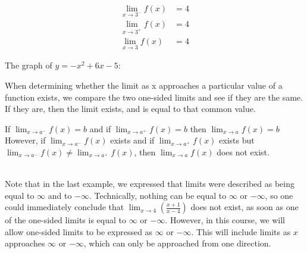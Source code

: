\documentclass{article}
\begin{document}
\begin{minipage}{0.6\textwidth}
    \begin{align*}
        \lim_{x \to 3^-} f(x) &= 4 \\
        \lim_{x \to 3^+} f(x) &= 4 \\
        \lim_{x \to 3} f(x) &= 4
    \end{align*}
\end{minipage}%
\vspace{1em}%
\begin{minipage}{0.6\textwidth}
    The graph of $y=-x^2+6x-5$:
    \begin{center}
    \end{center}
\end{minipage}
When determining whether the limit as x approaches a particular value of a function exists, we compare the two one-sided limits and see if they are the same. If they are, then the limit exists, and is equal to that common value.
\\ 
\begin{tcolorbox}[colback=Orchid!5!white,colframe=cadmiumgreen!75!white,coltitle=white,]
If $\lim _{x \rightarrow a^{-}} f(x)=b$ and if $\lim _{x \rightarrow a^{+}} f(x)=b$ then $\lim _{x \rightarrow a} f(x)=b$
However, if $\lim _{x \rightarrow a^{-}} f(x)$ exists and if $\lim _{x \rightarrow a^{+}} f(x)$ exists but $\lim _{x \rightarrow a^{-}} f(x) \neq \lim _{x \rightarrow a^{+}} f(x)$, then $\lim _{x \rightarrow a} f(x)$ does not exist. \\ \\ 
\end{tcolorbox}

Note that in the last example, we expressed that limits were described as being equal to $\infty$ and to $-\infty$. Technically, nothing can be equal to $\infty$ or $-\infty$, so one could immediately conclude that $\lim_{x \to 4}\left( \frac{x+1}{x-4}\right)$ does not exist, as soon as one of the one-sided limits is equal to $\infty$ or $-\infty$. However, in this course, we will allow one-sided limits to be expressed as $\infty$ or $-\infty$. This will include limits as $x$ approaches $\infty$ or $-\infty$, which can only be approached from one direction. 
\end{document}
